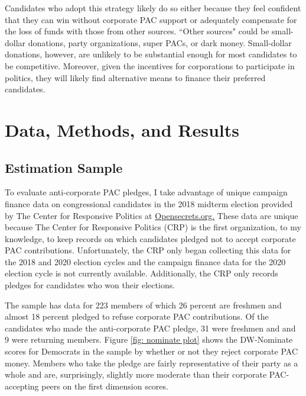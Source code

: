 \documentclass[12pt]{article}
\begin{document}
Candidates who adopt this strategy likely do so either because they feel confident that they can win without corporate PAC support or adequately compensate for the loss of funds with those from other sources. ``Other sources" could be small-dollar donations, party organizations, super PACs, or dark money. Small-dollar donations, however, are unlikely to be substantial enough for most candidates to be competitive. Moreover, given the incentives for corporations to participate in politics, they will likely find alternative means to finance their preferred candidates.


\section{Data, Methods, and Results}

\subsection{Estimation Sample}

To evaluate anti-corporate PAC pledges, I take advantage of unique campaign finance data on congressional candidates in the 2018 midterm election provided by The Center for Responsive Politics at \href{https://www.opensecrets.org}{Opensecrets.org.} These data are unique because The Center for Responsive Politics (CRP) is the first organization, to my knowledge, to keep records on which candidates pledged not to accept corporate PAC contributions. Unfortunately, the CRP only began collecting this data for the 2018 and 2020 election cycles and the campaign finance data for the 2020 election cycle is not currently available. Additionally, the CRP only records pledges for candidates who won their elections.

The sample has data for 223 members of which 26 percent are freshmen and almost 18 percent pledged to refuse corporate PAC contributions. Of the candidates who made the anti-corporate PAC pledge, 31 were freshmen and and 9 were returning members. Figure \ref{fig: nominate plot} shows the DW-Nominate scores for Democrats in the sample by whether or not they reject corporate PAC money. Members who take the pledge are fairly representative of their party as a whole and are, surprisingly, slightly more moderate than their corporate PAC-accepting peers on the first dimension scores. 
\end{document}
